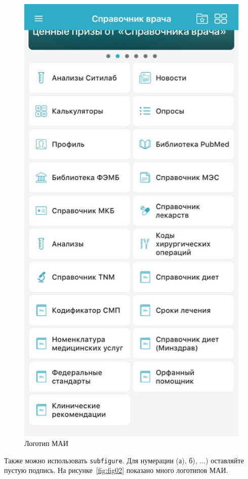 \begin{figure}
  \includegraphics[scale=0.6]{styles/diploma/inc/prog1.jpeg}
  \caption{Логотип МАИ}
  \label{fig:fig01}
\end{figure}

Также можно использовать \texttt{subfigure}. Для нумерации (а), б), ...) оставляйте пустую подпись. На рисунке~\ref{fig:fig02} показано много логотипов МАИ.


